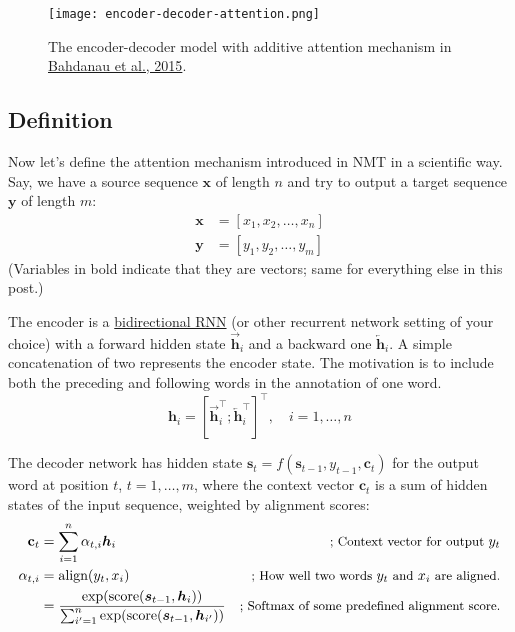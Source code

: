 \documentclass[12pt]{article}
\begin{document}
\begin{figure}[H]
    \centering
    \texttt{[image: encoder-decoder-attention.png]}
    \caption{The encoder-decoder model with additive attention mechanism in \href{https://arxiv.org/pdf/1409.0473.pdf}{Bahdanau et al., 2015}.}
\end{figure}

\subsection{Definition}
Now let’s define the attention mechanism introduced in NMT in a scientific way. Say, we have a source sequence $\mathbf{x}$ of length $n$ and try to output a target sequence $\mathbf{y}$ of length $m$:
\[
\begin{aligned}
\mathbf{x} &= [x_1, x_2, \dots, x_n] \\
\mathbf{y} &= [y_1, y_2, \dots, y_m]
\end{aligned}
\]
(Variables in bold indicate that they are vectors; same for everything else in this post.)

The encoder is a \href{https://www.coursera.org/lecture/nlp-sequence-models/bidirectional-rnn-fyXnn}{bidirectional RNN} (or other recurrent network setting of your choice) with a forward hidden state $\overrightarrow{\boldsymbol{h}}_i$ and a backward one $\overleftarrow{\boldsymbol{h}}_i$. A simple concatenation of two represents the encoder state. The motivation is to include both the preceding and following words in the annotation of one word.
\[
\boldsymbol{h}_i = [\overrightarrow{\boldsymbol{h}}_i^\top; \overleftarrow{\boldsymbol{h}}_i^\top]^\top, \quad i=1,\dots,n
\]

The decoder network has hidden state $\boldsymbol{s}_t=f(\boldsymbol{s}_{t-1}, y_{t-1}, \mathbf{c}_t)$ for the output word at position $t$, $t=1,\dots,m$, where the context vector $\mathbf{c}_t$ is a sum of hidden states of the input sequence, weighted by alignment scores:
\[
\begin{aligned}
\mathbf{c}_t &= \sum_{i=1}^n \alpha_{t,i} \boldsymbol{h}_i & \small{\text{; Context vector for output }y_t}\\
\alpha_{t,i} &= \text{align}(y_t, x_i) & \small{\text{; How well two words }y_t\text{ and }x_i\text{ are aligned.}}\\
&= \frac{\exp(\text{score}(\boldsymbol{s}_{t-1}, \boldsymbol{h}_i))}{\sum_{i'=1}^n \exp(\text{score}(\boldsymbol{s}_{t-1}, \boldsymbol{h}_{i'}))} & \small{\text{; Softmax of some predefined alignment score.}}
\end{aligned}
\]
\end{document}

